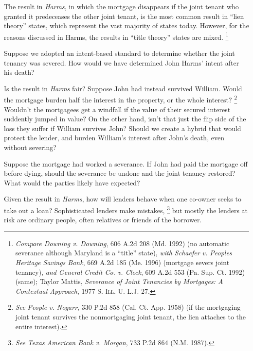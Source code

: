 
\item The result in \emph{Harms}, in which the mortgage disappears if the joint
tenant who granted it predeceases the other joint tenant, is the most common
result in ``lien theory'' states, which represent the vast majority of states
today. However, for the reasons discussed in Harms, the results in ``title
theory'' states are mixed. \footnote{\emph{Compare Downing v. Downing}, 606 A.2d
208 (Md. 1992) (no automatic severance although Maryland is a ``title'' state),
\emph{with Schaefer v. Peoples Heritage Savings Bank}, 669 A.2d 185 (Me. 1996)
(mortgage severs joint tenancy), \emph{and General Credit Co. v. Cleck}, 609
A.2d 553 (Pa. Sup. Ct. 1992) (same); Taylor Mattis, \emph{Severance of Joint
Tenancies by Mortgages: A Contextual Approach}, 1977 \textsc{S. Ill. U. L.J.}
27.}


Suppose we adopted an intent-based standard to determine whether the joint
tenancy was severed. How would we have determined John Harms' intent after his
death?



\item Is the result in \textit{Harms} fair? Suppose John had instead survived
William. Would the mortgage burden half the interest in the property, or the
whole interest? \footnote{\textit{See} \emph{People v. Nogarr}, 330 P.2d 858
(Cal. Ct. App. 1958) (if the mortgaging joint tenant survives the nonmortgaging
joint tenant, the lien attaches to the entire interest).} Wouldn't the
mortgagees get a windfall if the value of their secured interest suddently
jumped in value? On the other hand, isn't that just the flip side of the loss
they suffer if William survives John? Should we create a hybrid that would
protect the lender, and burden William's interest after John's death, even
without severing?


Suppose the mortgage had worked a severance. If John had paid the mortgage off
before dying, should the severance be undone and the joint tenancy restored?
What would the parties likely have expected?



\item Given the result in \textit{Harms}, how will lenders behave when one
co-owner seeks to take out a loan? Sophisticated lenders make mistakes,
\footnote{\emph{See Texas American Bank v. Morgan}, 733 P.2d 864 (N.M. 1987).}
but mostly the lenders at risk are ordinary people, often relatives or friends
of the borrower.


